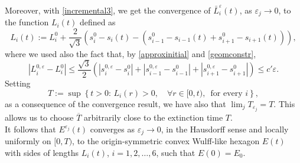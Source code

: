 \documentclass{interact}
\numberwithin{equation}{section}
\theoremstyle{definition}
\renewcommand{\epsilon}{\varepsilon}
\begin{document}
Moreover, with \eqref{incremental3}, we get the convergence of $\bar{L}_i^\epsilon(t)$, as $\epsilon_j\to0$, %
to the function $L_i(t)$ defined as
\begin{equation*}
L_i(t):=L_i^0+\frac{2}{\sqrt{3}}(s_i^0-s_i(t)-(s_{i-1}^0-s_{i-1}(t)+s_{i+1}^0-s_{i+1}(t))),
\end{equation*}
where we used also the fact that, by \eqref{approxinitial} and \eqref{geomconstr},
\begin{equation*}
|L_i^{0,\epsilon}-L_i^0|\leq\frac{\sqrt{3}}{2}(|s_i^{0,\epsilon}-s_i^0|+|s_{i-1}^{0,\epsilon}-s_{i-1}^0|+|s_{i+1}^{0,\epsilon}-s_{i+1}^0|)\leq c'\epsilon.
\end{equation*}
Setting
\begin{equation}
T:=\sup\left\{t>0:\, {L}_i(r)>0,\quad\forall r\in[0,t),\, \mbox{ for every $i$}\right\},
\end{equation}
as a consequence of the convergence result, we have also that $\lim_{j}T_{\epsilon_j}=T$. This allows us to choose $\overline{T}$ arbitrarily close to the extinction time $T$.\\
It follows that $E^{\epsilon_j}(t)$ converges as $\epsilon_j\to0$, in the Hausdorff sense and locally uniformly on $[0,T)$, to the origin-symmetric convex Wulff-like hexagon $E(t)$ with sides of lengths $L_i(t)$, $i=1,2,\dots,6$, such that $E(0)=E_0$.\\
\end{document}
